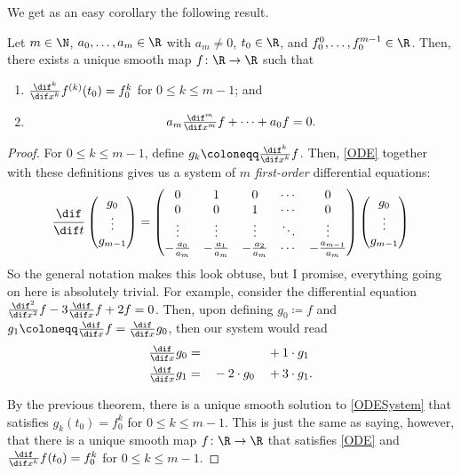 We get as an easy corollary the following result.
\begin{crl}{}{}
Let $m\in \N$, $a_0,\ldots ,a_m\in \R$ with $a_m\neq 0$, $t_0\in \R$, and $f_0^0,\ldots ,f_0^{m-1}\in \R$.  Then, there exists a unique smooth map $f\colon \R \rightarrow \R$ such that
\begin{enumerate}
\item $\frac{\dif ^k}{\dif x^k}f^{(k)}(t_0)=f_0^k$ for $0\leq k\leq m-1$; and
\item
\begin{equation}\label{ODE}
a_m\tfrac{\dif ^m}{\dif x^m}f+\cdots +a_0f=0.
\end{equation}
\end{enumerate}
\begin{proof}
For $0\leq k\leq m-1$, define $g_k\coloneqq \frac{\dif ^k}{\dif x^k}f$.  Then, \eqref{ODE} together with these definitions gives us a system of $m$ \emph{first-order} differential equations:
{\small
\begin{equation}\label{ODESystem}
\frac{\dif}{\dif t}\begin{pmatrix}g_0 \\ \vdots \\ g_{m-1}\end{pmatrix}=\begin{pmatrix}0 & 1 & 0 & \cdots & 0 \\ 0 & 0 & 1 & \cdots & 0 \\ \vdots & \vdots & \vdots & \ddots & \vdots \\ -\tfrac{a_0}{a_m} & -\tfrac{a_1}{a_m} & -\tfrac{a_2}{a_m} & \cdots & -\tfrac{a_{m-1}}{a_m}\end{pmatrix}\begin{pmatrix}g_0 \\ \vdots \\ g_{m-1}\end{pmatrix}
\end{equation}
}
So the general notation makes this look obtuse, but I promise, everything going on here is absolutely trivial.  For example, consider the differential equation $\frac{\dif ^2}{\dif x^2}f-3\frac{\dif}{\dif x}f+2f=0$.  Then, upon defining $g_0\coloneqq f$ and $g_1\coloneqq \frac{\dif}{\dif x}f=\frac{\dif}{\dif x}g_0$, then our system would read
\begin{equation}
\begin{aligned}
\tfrac{\dif}{\dif x}g_0 & = & & & & +1\cdot g_1 \\
\tfrac{\dif}{\dif x}g_1 & = & &-2\cdot g_0 & & +3\cdot g_1.
\end{aligned}
\end{equation}

By the previous theorem, there is a unique smooth solution to \eqref{ODESystem} that satisfies $g_k(t_0)=f_0^k$ for $0\leq k\leq m-1$.  This is just the same as saying, however, that there is a unique smooth map $f\colon \R \rightarrow \R$ that satisfies \eqref{ODE} and $\frac{\dif}{\dif x^k}f(t_0)=f_0^k$ for $0\leq k\leq m-1$.
\end{proof}
\end{crl}

